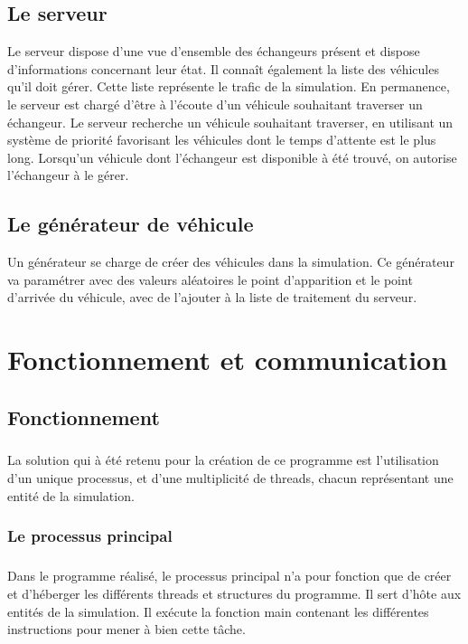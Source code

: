 \documentclass{report}
\begin{document}
	\section{Le serveur}
	Le serveur dispose d'une vue d'ensemble des échangeurs présent et dispose d'informations concernant leur état. Il connaît également la liste des véhicules qu'il doit gérer. Cette liste représente le trafic de la simulation. En permanence, le serveur est chargé d'être à l'écoute d'un véhicule souhaitant traverser un échangeur. Le serveur recherche un véhicule souhaitant traverser, en utilisant un système de priorité favorisant les véhicules dont le temps d'attente est le plus long. Lorsqu'un véhicule dont l'échangeur est disponible à été trouvé, on autorise l'échangeur à le gérer.
	
	\section{Le générateur de véhicule}
	Un générateur se charge de créer des véhicules dans la simulation. Ce générateur va paramétrer avec des valeurs aléatoires le point d'apparition et le point d'arrivée du véhicule, avec de l'ajouter à la liste de traitement du serveur.

\chapter{Fonctionnement et communication}
	
	\section{Fonctionnement}
	\paragraph{}
	La solution qui à été retenu pour la création de ce programme est l'utilisation d'un unique processus, et d'une multiplicité de threads, chacun représentant une entité de la simulation.
	
	\subsection{Le processus principal}
	\paragraph{}
	Dans le programme réalisé, le processus principal n'a pour fonction que de créer et d’héberger les différents threads et structures du programme. Il sert d'hôte aux entités de la simulation. Il exécute la fonction main contenant les différentes instructions pour mener à bien cette tâche.
\end{document}
